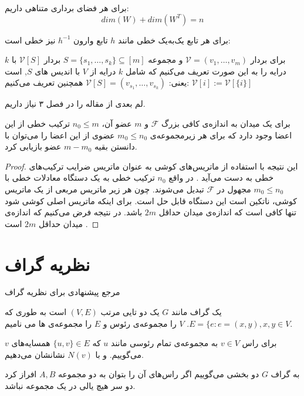\begin{theorem}
	برای هر فضای برداری متناهی داریم:
	$$dim(W) + dim(W^T) = n$$
\end{theorem}
\begin{remark}
	برای هر تابع یک‌به‌یک خطی مانند
	$h$
	تابع وارون 
	$h^{-1}$
	نیز خطی است:
\end{remark}

برای بردار
$\mathcal{V} = (v_1, \ldots, v_m)$ 
و مجموعه
$S = \{s_1, \ldots, s_k\} \subseteq [m]$
بردار
$\mathcal{V} [S]$ 
با 
$k$
درایه را به این صورت تعریف می‌کنیم که شامل
$k$ 
درایه از
$V$ 
با اندیس های
$S$, 
است یعنی:
$\mathcal{V} [S] = (v_{s_1}, \ldots, v_{s_k})$
همچنین تعریف می‌کنیم:
$\mathcal{V} [i] := \mathcal{V} [{\{i\}}]$

لم بعدی از مقاله
\cite{pliable2015paper}
را در فصل ۳ نیاز داریم.
\begin{lemma}
	\label{lemma:pliable20151}
	برای یک میدان به اندازه‌ی کافی بزرگ
	$\mathcal{F}$
	و
	$m$
	عضو آن،
	$n_0 \leq m$
	ترکیب خطی از این اعضا وجود دارد که برای هر زیرمجموعه‌ی
	$m_0 \leq n_0$
	عضوی از این اعضا را می‌توان با دانستن بقیه
	$m - m_0$
	عضو بازیابی کرد.
\end{lemma}
\begin{proof}
این نتیجه با استفاده از ماتریس‌های کوشی به عنوان ماتریس ضرایب ترکیب‌های خطی به دست می‌آید
\cite{Blmer1995AnXE}
. در واقع
$n_0$
ترکیب خطی به یک دستگاه معادلات خطی با
$m_0 \leq n_0$
مجهول در
$\mathcal{F}$
تبدیل می‌شوند. چون هر زیر ماتریس مربعی از یک ماتریس کوشی، ناتکین است این دستگاه قابل حل است. برای اینکه ماتریس اصلی کوشی شود تنها کافی است که اندازه‌ی میدان حداقل
$2m$
باشد. در نتیجه فرض می‌کنیم که اندازه‌ی میدان حداقل
$2m$
است
\cite{pliable2015paper}.
\end{proof}
\section{نظریه گراف}
مرجع پیشنهادی برای نظریه گراف
\cite{west}
\begin{definition}
یک گراف مانند
$G$
یک دو تایی مرتب
$(V, E)$
است به طوری که
$E = \{e: e = (x, y), x, y \in V$.
 $V$
را مجموعه‌ی رئوس و
$E$
را مجموعه‌ی 
ها
می نامیم.

برای راس
$v\in V$
به مجمو‌عه‌ی تمام رئوسی مانند
  $u$ 
  که
  $\{u,v\}\in E$ 
  همسایه‌های 
  $v$
  می‌گوییم.
  و با
  $N(v)$
  نشانشان می‌دهیم.
  
به گراف
$G$
دو بخشی می‌گوییم اگر راس‌های آن را بتوان به دو مجموعه 
$A, B$
افراز کرد دو سر هیچ یالی در یک مجموعه نباشد.
\end{definition}


